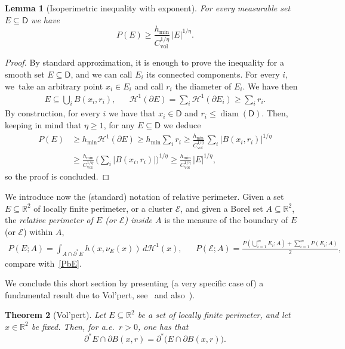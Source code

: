 \documentclass[JEP,XML,SOM,Unicode,NoFloatCountersInSection]{cedram}
\DeclareMathOperator{\diam}{diam}
\newcommand\R{\mathbb{R}}
\newcommand\Cgr{C_\mathrm{vol}}
\newcommand\E{\mathcal{E}}
\renewcommand\H{\mathcal{H}}
\theoremstyle{plain}
\newtheorem{thm}{Theorem}[section]
\newtheorem{lem}[thm]{Lemma}
\theoremstyle{definition}
\begin{document}
\begin{lem}[Isoperimetric inequality with exponent]\label{disgusting}
For every measurable set $E\subseteq \mathsf{D}$ we have
\[
P(E) \geq \frac{h_{\min}}{\Cgr^{1/\eta}}\, |E|^{1/\eta}.
\]
\end{lem}
\begin{proof}
By standard approximation, it is enough to prove the inequality for a smooth set $E\subseteq \mathsf{D}$, and we can call $E_i$ its connected components. For every $i$, we~take an arbitrary point $x_i\in E_i$ and call $r_i$ the diameter of $E_i$. We have then
\begin{align*}
E\subseteq \bigcup_i B(x_i,r_i), && \H^1(\partial E)=\sum_i \H^1(\partial E_i) \geq \sum_i r_i.
\end{align*}
By construction, for every $i$ we have that $x_i\in \mathsf{D}$ and $r_i\leq \diam(\mathsf{D})$. Then, keeping in mind that $\eta\geq 1$, for any $E\subseteq \mathsf{D}$ we deduce
\[\begin{split}
P(E)&\geq h_{\min} \H^1(\partial E)
\geq h_{\min} \sum\nolimits_i r_i
\geq \frac{h_{\min}}{\Cgr^{1/\eta}}\, \sum\nolimits_i |B(x_i,r_i)|^{1/\eta}\\
&\geq \frac{h_{\min}}{\Cgr^{1/\eta}}\, \Big(\sum\nolimits_i |B(x_i,r_i)|\Big)^{1/\eta}
\geq \frac{h_{\min}}{\Cgr^{1/\eta}}\, |E|^{1/\eta},
\end{split}\]
so the proof is concluded.
\end{proof}

We introduce now the (standard) notation of relative perimeter. Given a set $E\subseteq\R^2$ of locally finite perimeter, or a cluster $\E$, and given a Borel set $A\subseteq \R^2$, the \emph{relative perimeter of $E$ (or $\E$) inside $A$} is the measure of the boundary of $E$ (or $\E$) within $A$, \ie
\begin{align*}
P(E;A) = \int_{A\cap\partial^* E} h(x,\nu_E(x))\, d\H^1(x), &&
P(\E;A) = \frac{P(\bigcup_{i=1}^m E_i;A) + \sum_{i=1}^m P(E_i;A) }2 ,
\end{align*}
compare with~\eqref{PbE}.

We conclude this short section by presenting (a very specific case of) a fundamental result due to Vol'pert, see~\cite{Volpert} and also~\cite[Th.\,3.108]{AFP}).
\begin{thm}[Vol'pert]\label{volpert}
Let $E\subseteq\R^2$ be a set of locally finite perimeter, and let $x\in\R^2$ be fixed. Then, for a.e.\ $r>0$, one has that
\[
\partial^* E \cap \partial B(x,r) = \partial^* \big( E \cap \partial B(x,r)\big).
\]
\end{thm}
\end{document}
